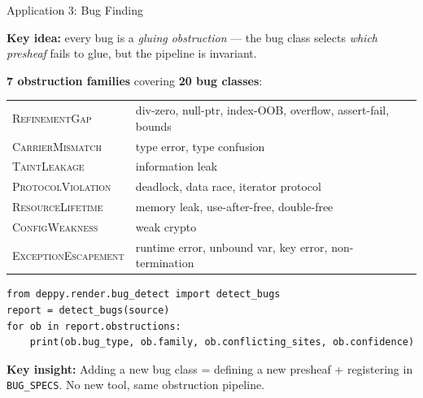 \documentclass[aspectratio=169,10pt]{beamer}
\newcommand{\keyinsight}[1]{%
  \vspace{2pt}
  \begin{center}
  \colorbox{sheafbox}{\parbox{0.88\textwidth}{\centering\small\textbf{\textcolor{keyblue}{Key insight:}} #1}}
  \end{center}
  \vspace{-4pt}
}
\begin{document}
\begin{frame}[fragile]{Application 3: Bug Finding}

\textbf{Key idea:} every bug is a \emph{gluing obstruction} --- the bug class selects
\emph{which presheaf} fails to glue, but the pipeline is invariant.

\vspace{0.2em}
{\footnotesize
\textbf{7 obstruction families} covering \textbf{20 bug classes}:

\vspace{0.1em}
\begin{tabular}{@{}lp{7.5cm}@{}}
\textsc{RefinementGap} & div-zero, null-ptr, index-OOB, overflow, assert-fail, bounds \\
\textsc{CarrierMismatch} & type error, type confusion \\
\textsc{TaintLeakage} & information leak \\
\textsc{ProtocolViolation} & deadlock, data race, iterator protocol \\
\textsc{ResourceLifetime} & memory leak, use-after-free, double-free \\
\textsc{ConfigWeakness} & weak crypto \\
\textsc{ExceptionEscapement} & runtime error, unbound var, key error, non-termination \\
\end{tabular}
}

\begin{lstlisting}
from deppy.render.bug_detect import detect_bugs
report = detect_bugs(source)
for ob in report.obstructions:
    print(ob.bug_type, ob.family, ob.conflicting_sites, ob.confidence)
\end{lstlisting}

\keyinsight{Adding a new bug class = defining a new presheaf + registering in \texttt{BUG\_SPECS}.
No new tool, same obstruction pipeline.}
\end{frame}
\end{document}
